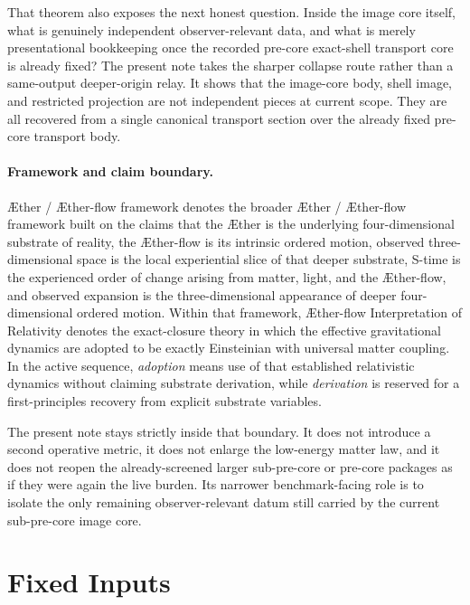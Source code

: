 \documentclass[11pt]{article}
\newcommand{\Aether}{\AE{}ther}
\newcommand{\Aflow}{\AE{}ther-flow}
\newcommand{\TheoryName}{\Aflow{} Interpretation of Relativity}
\newcommand{\TheoryProgram}{\Aether{} / \Aflow{} framework}
\begin{document}
That theorem also exposes the next honest question. Inside the image core itself, what is genuinely independent observer-relevant data, and what is merely presentational bookkeeping once the recorded pre-core exact-shell transport core is already fixed? The present note takes the sharper collapse route rather than a same-output deeper-origin relay. It shows that the image-core body, shell image, and restricted projection are not independent pieces at current scope. They are all recovered from a single canonical transport section over the already fixed pre-core transport body.

\paragraph{Framework and claim boundary.}
\TheoryProgram{} denotes the broader \Aether{} / \Aflow{} framework built on the claims that the \Aether{} is the underlying four-dimensional substrate of reality, the \Aflow{} is its intrinsic ordered motion, observed three-dimensional space is the local experiential slice of that deeper substrate, S-time is the experienced order of change arising from matter, light, and the \Aflow{}, and observed expansion is the three-dimensional appearance of deeper four-dimensional ordered motion. Within that framework, \TheoryName{} denotes the exact-closure theory in which the effective gravitational dynamics are adopted to be exactly Einsteinian with universal matter coupling. In the active sequence, \emph{adoption} means use of that established relativistic dynamics without claiming substrate derivation, while \emph{derivation} is reserved for a first-principles recovery from explicit substrate variables.

The present note stays strictly inside that boundary. It does not introduce a second operative metric, it does not enlarge the low-energy matter law, and it does not reopen the already-screened larger sub-pre-core or pre-core packages as if they were again the live burden. Its narrower benchmark-facing role is to isolate the only remaining observer-relevant datum still carried by the current sub-pre-core image core.

\section{Fixed Inputs}
\end{document}
